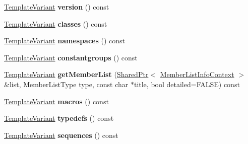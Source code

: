 \begin{DoxyCompactItemize}
\mbox{\hyperlink{class_template_variant}{Template\+Variant}} {\bfseries version} () const
\item 
\mbox{\label{class_file_context_1_1_private_a004779b812fe15b0f6244d111ecfa9fa}} 
\mbox{\hyperlink{class_template_variant}{Template\+Variant}} {\bfseries classes} () const
\item 
\mbox{\label{class_file_context_1_1_private_a9b5dd634ef5a1fc06292cfcf045eb8c3}} 
\mbox{\hyperlink{class_template_variant}{Template\+Variant}} {\bfseries namespaces} () const
\item 
\mbox{\label{class_file_context_1_1_private_ae165871f58de87aa427771934040a794}} 
\mbox{\hyperlink{class_template_variant}{Template\+Variant}} {\bfseries constantgroups} () const
\item 
\mbox{\label{class_file_context_1_1_private_afc97c7871efb54c88014ecddc8f9d558}} 
\mbox{\hyperlink{class_template_variant}{Template\+Variant}} {\bfseries get\+Member\+List} (\mbox{\hyperlink{class_shared_ptr}{Shared\+Ptr}}$<$ \mbox{\hyperlink{class_member_list_info_context}{Member\+List\+Info\+Context}} $>$ \&list, Member\+List\+Type type, const char $\ast$title, bool detailed=F\+A\+L\+SE) const
\item 
\mbox{\label{class_file_context_1_1_private_a99e3e673e9db4f67dc78b0fc55ffab80}} 
\mbox{\hyperlink{class_template_variant}{Template\+Variant}} {\bfseries macros} () const
\item 
\mbox{\label{class_file_context_1_1_private_ae4cce0281cc111853bb59cd28764356b}} 
\mbox{\hyperlink{class_template_variant}{Template\+Variant}} {\bfseries typedefs} () const
\item 
\mbox{\label{class_file_context_1_1_private_adb140f53cd87e46eccb6d27250dbbf67}} 
\mbox{\hyperlink{class_template_variant}{Template\+Variant}} {\bfseries sequences} () const
\item 
\mbox{\label{class_file_context_1_1_private_a61c23724466787fbfaa967c54e3a52a9}} 

\end{DoxyCompactItemize}
